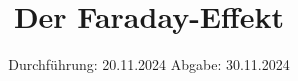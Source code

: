 

\subject{V46}
\title{Der Faraday-Effekt}
\date{%
  Durchführung: 20.11.2024
  \hspace{3em}
  Abgabe: 30.11.2024
}



\maketitle
\thispagestyle{empty}
\tableofcontents
\newpage








\printbibliography{}


